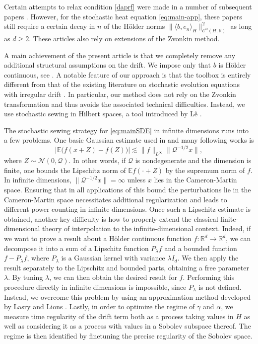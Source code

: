 \documentclass[11pt,a4paper]{article}
\newcommand{\C}{\mathcal{C}}
\newcommand{\cQ}{\mathcal{Q}}
\newcommand{\R}{\mathbb{R}}
\newcommand{\EE}{\mathbb{E}}
\renewcommand{\ge}{\geqslant}
\numberwithin{equation}{section}
\let\cref\crtcref
\theoremstyle{definition}
\theoremstyle{remark}
\theoremstyle{plain}
\begin{document}
Certain attempts to relax condition \eqref{daprf} were made in a number of subsequent papers \cite{AddonaBignamini2023,AddonaBignamini2024,AddonaMasieroPriola}.  
However,  for the stochastic heat equation \eqref{eq:main-app}, these papers still require a certain decay in $n$ of the H\"older norms $   
\|\langle b, e_n\rangle_H\|^2_{\C^\alpha(H,\R)}$ as long as $d\ge2$. These articles also rely on extensions of the Zvonkin method.


A main achievement of the present article is that we completely remove any additional structural assumptions on the drift. We impose only that $b$ is H\"older continuous, see \cref{thm:main}. A notable feature of our approach is that the toolbox is entirely different from that of the existing literature on stochastic evolution equations with irregular drift \cite{FlandoliDaPrato,DaPratoFlandoli2024,DFPR13,AddonaBignamini2023,AddonaMasieroPriola,AddonaBignamini2024,Priola,Priolaerratum}. In particular, our method does not rely on the Zvonkin transformation and thus avoids the associated technical difficulties. Instead, we use stochastic sewing in Hilbert spaces, a tool introduced by L\^e \cite{Leinitial, Le}.

The stochastic sewing strategy for \eqref{eq:mainSDE} in infinite dimensions runs into a few problems.
One basic Gaussian estimate used in \cite{Leinitial} and many following works is 
\begin{equation*}
\big|\EE\big(f(x+Z)-f(Z)\big)\big|\lesssim \|f\|_{L^\infty} \|\cQ^{-1/2}x\|,    
\end{equation*} where $Z\sim \mathcal{N}(0,\cQ)$. In other words, if $\cQ$ is nondegenerate and the dimension is finite, one bounds the Lipschitz norm of $\EE f(\cdot+Z)$ by the supremum norm of $f$.
In infinite dimensions, $\|\cQ^{-1/2}x\|=\infty$ unless $x$ lies in the Cameron-Martin space.
Ensuring that in all applications of this bound the perturbations lie in the Cameron-Martin space necessitates additional regularization and leads to different power counting in infinite dimensions.
Once such a Lipschitz estimate is obtained, another key difficulty is how to properly extend the classical finite-dimensional theory of interpolation to the infinite-dimensional context. Indeed, if we want to prove a result about a H\"older continuous function $f\colon \R^d \to \R^d$, we can decompose it into a sum of a Lipschitz function $P_\lambda f$ and a bounded function $f - P_\lambda f$, where $P_\lambda$ is a Gaussian  kernel with variance $\lambda I_d$. We then apply the result separately to the Lipschitz and bounded parts, obtaining a free parameter $\lambda$. By tuning $\lambda$, we can then obtain the desired result for $f$. Performing this procedure directly in infinite dimensions is impossible, since $P_\lambda$ is not defined. Instead, we overcome this problem by using an approximation method developed by Lasry and Lions \cite{LasryLions}. Lastly, in order to optimize the regime of $\gamma$ and $\alpha$, we measure time regularity of the drift term both as a process taking values in $H$ as well as considering it as a process with values in a Sobolev subspace thereof. The regime is then identified by finetuning the precise regularity of the Sobolev space.
\end{document}
